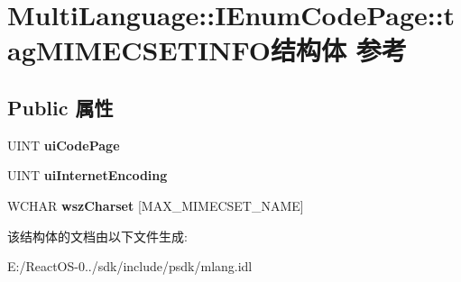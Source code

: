 \hypertarget{struct_multi_language_1_1_i_enum_code_page_1_1tag_m_i_m_e_c_s_e_t_i_n_f_o}{}\section{Multi\+Language\+:\+:I\+Enum\+Code\+Page\+:\+:tag\+M\+I\+M\+E\+C\+S\+E\+T\+I\+N\+F\+O结构体 参考}
\label{struct_multi_language_1_1_i_enum_code_page_1_1tag_m_i_m_e_c_s_e_t_i_n_f_o}
\subsection*{Public 属性}
\begin{DoxyCompactItemize}
\item 
\mbox{\label{struct_multi_language_1_1_i_enum_code_page_1_1tag_m_i_m_e_c_s_e_t_i_n_f_o_a519e08998250fb0ef5b65bddabb448aa}} 
U\+I\+NT {\bfseries ui\+Code\+Page}
\item 
\mbox{\label{struct_multi_language_1_1_i_enum_code_page_1_1tag_m_i_m_e_c_s_e_t_i_n_f_o_a97ba4fb3e56d2944ccbf27c9fa88beb4}} 
U\+I\+NT {\bfseries ui\+Internet\+Encoding}
\item 
\mbox{\label{struct_multi_language_1_1_i_enum_code_page_1_1tag_m_i_m_e_c_s_e_t_i_n_f_o_ab3bc6fa59bbb27c968f5ea07544858e8}} 
W\+C\+H\+AR {\bfseries wsz\+Charset} \mbox{[}M\+A\+X\+\_\+\+M\+I\+M\+E\+C\+S\+E\+T\+\_\+\+N\+A\+ME\mbox{]}
\end{DoxyCompactItemize}


该结构体的文档由以下文件生成\+:\begin{DoxyCompactItemize}
\item 
E\+:/\+React\+O\+S-\/0../sdk/include/psdk/mlang.\+idl\end{DoxyCompactItemize}
